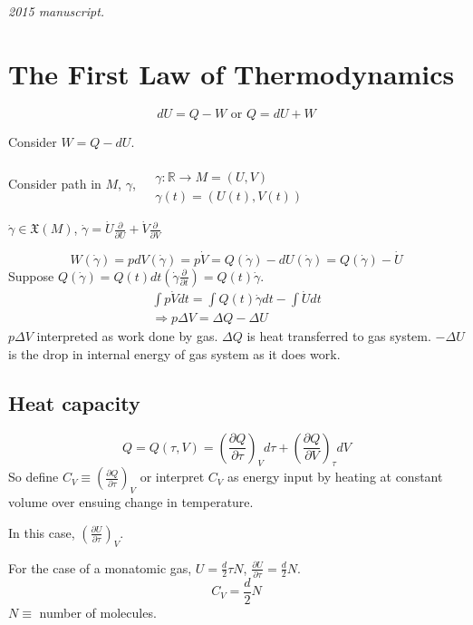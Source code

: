 \noindent\textit{2015 manuscript.}

\section{The First Law of Thermodynamics}

\[
dU = Q - W \text{ or } Q = dU + W 
\]

Consider $W = Q-dU$.  

Consider path in $M$, $\gamma$, $\begin{aligned} & \quad \\
  & \gamma : \mathbb{R} \to M = (U,V) \\
  & \gamma(t) = (U(t), V(t)) \end{aligned}$

$\dot{\gamma} \in \mathfrak{X}(M)$, $\dot{\gamma} = \dot{U} \frac{\partial }{ \partial U} + \dot{V} \frac{ \partial }{ \partial V}$

\[
W(\dot{\gamma}) = pdV(\dot{\gamma}) = p\dot{V} = Q(\dot{\gamma}) - dU(\dot{\gamma}) = Q(\dot{\gamma}) - \dot{U}
\]
Suppose $Q(\dot{\gamma}) = Q(t)dt(\dot{\gamma} \frac{ \partial }{ \partial t} ) = Q(t) \dot{\gamma}$.  
\[
\begin{gathered}
  \int p \dot{V} dt = \int Q(t) \dot{\gamma}dt - \int \dot{U}dt \\ 
  \Longrightarrow p\Delta V = \Delta Q - \Delta U
\end{gathered}
\]
$p\Delta V$ interpreted as work done by gas. $\Delta Q$ is heat transferred to gas system.  $-\Delta U$ is the drop in internal energy of gas system as it does work.  

\subsection{Heat capacity}

\[
Q = Q(\tau,V) = \left( \frac{ \partial Q}{ \partial \tau} \right)_V d\tau +  \left( \frac{ \partial Q}{ \partial V} \right)_{\tau} dV
\]
So define $C_V \equiv \left( \frac{ \partial Q}{ \partial \tau} \right)_V$ or interpret $C_V$ as energy input by heating at constant volume over ensuing change in temperature.  

In this case, $\left( \frac{ \partial U}{ \partial \tau } \right)_V$.  

For the case of a monatomic gas, $U =\frac{d}{2} \tau N$, $\frac{ \partial U}{ \partial \tau} = \frac{d}{2} N$.  
\[
C_V = \frac{d}{2} N
\]
$N \equiv $ number of molecules.  


